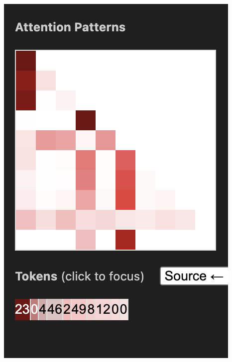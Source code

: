 \documentclass{article}
\begin{document}
\begin{center}
    \includegraphics[scale=0.4]{images/att_variable2.png}

\end{center}
\end{document}
